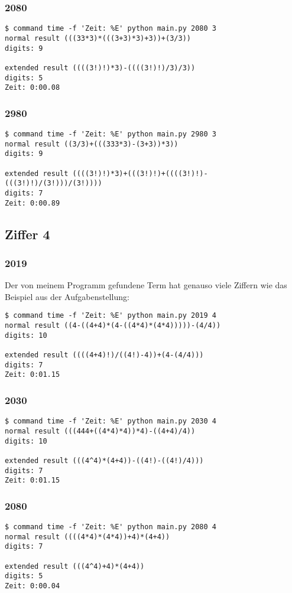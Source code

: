 \subsubsection{2080}
\begin{lstlisting}
$ command time -f 'Zeit: %E' python main.py 2080 3
normal result (((33*3)*(((3+3)*3)+3))+(3/3))
digits: 9

extended result ((((3!)!)*3)-((((3!)!)/3)/3))
digits: 5
Zeit: 0:00.08
\end{lstlisting}
\subsubsection{2980}
\begin{lstlisting}
$ command time -f 'Zeit: %E' python main.py 2980 3
normal result ((3/3)+(((333*3)-(3+3))*3))
digits: 9

extended result ((((3!)!)*3)+(((3!)!)+((((3!)!)-(((3!)!)/(3!)))/(3!))))
digits: 7
Zeit: 0:00.89
\end{lstlisting}
\subsection{Ziffer 4}
\subsubsection{2019}
Der von meinem Programm gefundene Term hat genauso viele Ziffern wie das Beispiel aus der Aufgabenstellung:
\begin{lstlisting}
$ command time -f 'Zeit: %E' python main.py 2019 4
normal result ((4-((4+4)*(4-((4*4)*(4*4)))))-(4/4))
digits: 10

extended result ((((4+4)!)/((4!)-4))+(4-(4/4)))
digits: 7
Zeit: 0:01.15
\end{lstlisting}
\subsubsection{2030}
\begin{lstlisting}
$ command time -f 'Zeit: %E' python main.py 2030 4
normal result (((444+((4*4)*4))*4)-((4+4)/4))
digits: 10

extended result (((4^4)*(4+4))-((4!)-((4!)/4)))
digits: 7
Zeit: 0:01.15
\end{lstlisting}
\subsubsection{2080}
\begin{lstlisting}
$ command time -f 'Zeit: %E' python main.py 2080 4
normal result ((((4*4)*(4*4))+4)*(4+4))
digits: 7

extended result (((4^4)+4)*(4+4))
digits: 5
Zeit: 0:00.04
\end{lstlisting}
